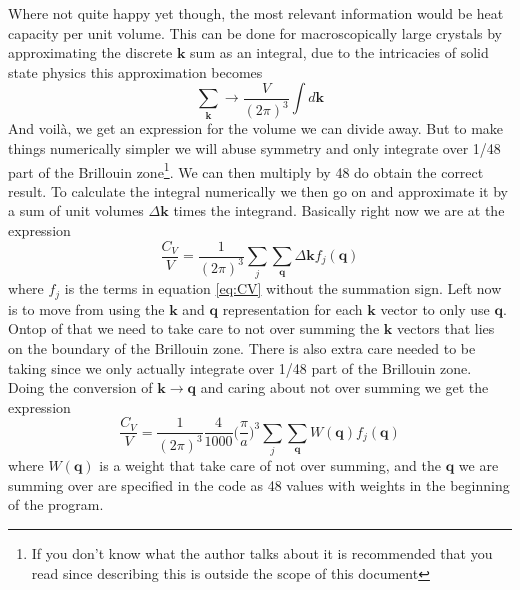 \documentclass[11pt]{article}
\begin{document}
Where not quite happy yet though, the most relevant information would be heat capacity per unit volume. This can be done for macroscopically large crystals by approximating the discrete $\mathbf{k}$ sum as an integral, due to the intricacies of solid state physics this approximation becomes
\begin{equation}
	\sum_\mathbf{k} \rightarrow \frac{V}{(2\pi)^3} \int d\mathbf{k}
\end{equation}
And voilà, we get an expression for the volume we can divide away. But to make things numerically simpler we will abuse symmetry and only integrate over 1/48 part of the Brillouin zone\footnote{If you don't know what the author talks about it is recommended that you read \cite{bib:solid} since describing this is outside the scope of this document}. We can then multiply by 48 do obtain the correct result. To calculate the integral numerically we then go on and approximate it by a sum of unit volumes $\Delta\mathbf{k}$ times the integrand. Basically right now we are at the expression
\begin{equation}
	\frac{C_V}{V} = \frac{1}{(2\pi)^3} \sum_j \sum_\mathbf{q} \Delta\mathbf{k} f_j(\mathbf{q})
\end{equation}
where $f_j$ is the terms in equation \ref{eq:CV} without the summation sign. Left now is to move from using the $\mathbf{k}$ and $\mathbf{q}$ representation for each $\mathbf{k}$ vector to only use $\mathbf{q}$. Ontop of that we need to take care to not over summing the $\mathbf{k}$ vectors that lies on the boundary of the Brillouin zone. There is also extra care needed to be taking since we only actually integrate over 1/48 part of the Brillouin zone. Doing the conversion of $\mathbf{k}\rightarrow\mathbf{q}$ and caring about not over summing we get the expression
\begin{equation}
	\frac{C_V}{V} = \frac{1}{(2\pi)^3} \frac{4}{1000} \big(\frac{\pi}{a})^3 \sum_j \sum_{\mathbf{q}} W(\mathbf{q})f_j(\mathbf{q}) 
\end{equation}
where $W(\mathbf{q})$ is a weight that take care of not over summing, and the $\mathbf{q}$ we are summing over are specified in the code as 48 values with weights in the beginning of the program. 
\end{document}
